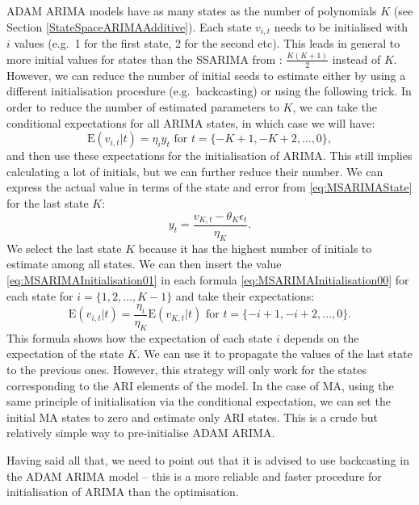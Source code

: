 \documentclass[
]{book}
\theoremstyle{definition}
\theoremstyle{definition}
\theoremstyle{definition}
\theoremstyle{definition}
\theoremstyle{remark}
\begin{document}
ADAM ARIMA models have as many states as the number of polynomials \(K\) (see Section \ref{StateSpaceARIMAAdditive}). Each state \(v_{i,t}\) needs to be initialised with \(i\) values (e.g.~1 for the first state, 2 for the second etc). This leads in general to more initial values for states than the SSARIMA from \citet{Svetunkov2019}: \(\frac{K(K+1)}{2}\) instead of \(K\).
However, we can reduce the number of initial seeds to estimate either by using a different initialisation procedure (e.g.~backcasting) or using the following trick. In order to reduce the number of estimated parameters to \(K\), we can take the conditional expectations for all ARIMA states, in which case we will have:
\begin{equation}
  \mathrm{E}(v_{i,t} | t) = \eta_i y_{t} \text{ for } t=\{-K+1, -K+2, \dots, 0\},
  \label{eq:MSARIMAInitialisation00}
\end{equation}
and then use these expectations for the initialisation of ARIMA. This still implies calculating a lot of initials, but we can further reduce their number. We can express the actual value in terms of the state and error from \eqref{eq:MSARIMAState} for the last state \(K\):
\begin{equation}
  y_{t} = \frac{v_{K,t} -\theta_K \epsilon_{t}}{\eta_K}.
  \label{eq:MSARIMAInitialisation01}
\end{equation}
We select the last state \(K\) because it has the highest number of initials to estimate among all states. We can then insert the value \eqref{eq:MSARIMAInitialisation01} in each formula \eqref{eq:MSARIMAInitialisation00} for each state for \(i=\{1, 2, \dots, K-1\}\) and take their expectations:
\begin{equation}
  \mathrm{E}(v_{i,t}|t) = \frac{\eta_i}{\eta_K} \mathrm{E}(v_{K,t}|t)  \text{ for } t=\{-i+1, -i+2, \dots, 0\}.
  \label{eq:MSARIMAInitialisation02}
\end{equation}
This formula shows how the expectation of each state \(i\) depends on the expectation of the state \(K\). We can use it to propagate the values of the last state to the previous ones. However, this strategy will only work for the states corresponding to the ARI elements of the model. In the case of MA, using the same principle of initialisation via the conditional expectation, we can set the initial MA states to zero and estimate only ARI states. This is a crude but relatively simple way to pre-initialise ADAM ARIMA.

Having said all that, we need to point out that it is advised to use backcasting in the ADAM ARIMA model -- this is a more reliable and faster procedure for initialisation of ARIMA than the optimisation.
\end{document}
